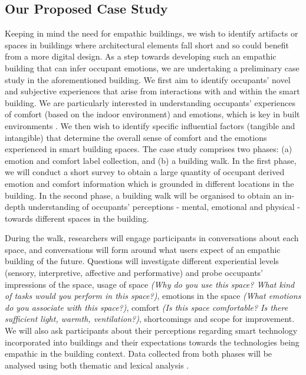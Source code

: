 \documentclass [sigconf] {acmart}
\begin{document}
\subsection{Our Proposed Case Study} 
Keeping in mind the need for empathic buildings, we wish to identify artifacts or spaces in buildings where architectural elements fall short and so could benefit from a more digital design. As a step towards developing such an empathic building that can infer occupant emotions, we are undertaking a preliminary case study in the aforementioned building. We first aim to identify occupants' novel and subjective experiences that arise from interactions with and within the smart building. We are particularly interested in understanding occupants' experiences of comfort (based on the indoor environment) and emotions, which is key in built environments \cite{alavi2017comfort}.  We then wish to identify specific influential factors (tangible and intangible) that determine the overall sense of comfort and the emotions experienced in smart building spaces. The case study comprises two phases: (a) emotion and comfort label collection, and (b) a building walk. In the first phase, we will conduct a short survey to obtain a large quantity of occupant derived emotion and comfort information which is grounded in different locations in the building. In the second phase, a building walk will be organised to obtain an in-depth understanding of occupants' perceptions - mental, emotional and physical - towards different spaces in the building.

During the walk, researchers will engage participants in conversations about each space, and conversations will form around what users expect of an empathic building of the future. Questions will investigate different experiential levels (sensory, interpretive, affective and performative) and probe occupants' impressions of the space, usage of space \textit{(Why do you use this space? What kind of tasks would you perform in this space?)}, emotions in the space \textit{(What emotions do you associate with this space?)}, comfort \textit{(Is this space comfortable? Is there sufficient light, warmth, ventilation?)}, shortcomings and scope for improvement. We will also ask participants about their perceptions regarding smart technology incorporated into buildings and their expectations towards the technologies being empathic in the building context. Data collected from both phases will be analysed using both thematic and lexical analysis \cite{braun2006using, xue2020mood}. 
\end{document}
